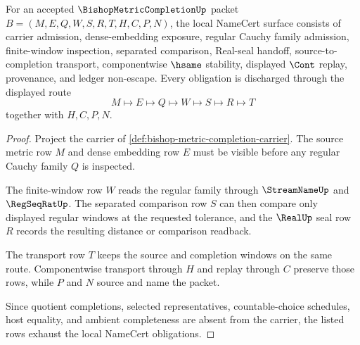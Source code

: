 \begin{theorem}
\label{thm:bishop-metric-completion-namecert-obligations}
For an accepted $\BishopMetricCompletionUp$ packet $B=(M,E,Q,W,S,R,T,H,C,P,N)$, the local NameCert surface consists of carrier admission, dense-embedding exposure, regular Cauchy family admission, finite-window inspection, separated comparison, Real-seal handoff, source-to-completion transport, componentwise $\hsame$ stability, displayed $\Cont$ replay, provenance, and ledger non-escape. Every obligation is discharged through the displayed route
$$
M\longmapsto E\longmapsto Q\longmapsto W\longmapsto S\longmapsto R\longmapsto T
$$
together with $H,C,P,N$.
\end{theorem}
\begin{proof}
Project the carrier of \autoref{def:bishop-metric-completion-carrier}. The source metric row $M$ and dense embedding row $E$ must be visible before any regular Cauchy family $Q$ is inspected.

The finite-window row $W$ reads the regular family through $\StreamNameUp$ and $\RegSeqRatUp$. The separated comparison row $S$ can then compare only displayed regular windows at the requested tolerance, and the $\RealUp$ seal row $R$ records the resulting distance or comparison readback.

The transport row $T$ keeps the source and completion windows on the same route. Componentwise transport through $H$ and replay through $C$ preserve those rows, while $P$ and $N$ source and name the packet.

Since quotient completions, selected representatives, countable-choice schedules, host equality, and ambient completeness are absent from the carrier, the listed rows exhaust the local NameCert obligations.
\end{proof}

